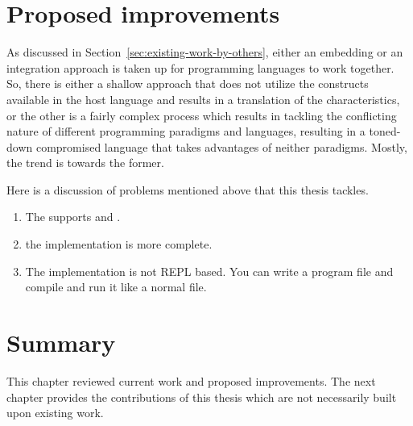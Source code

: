 \documentclass[thesis-solanki.tex]{subfiles}
\begin{document}
\section{Proposed improvements}\label{sec:things-fixed}

As discussed in Section~\ref{sec:existing-work-by-others},
either an embedding or an integration approach is taken up for programming languages to work together.
So, there is either a shallow approach that does not utilize the constructs available in the host language and
results in a translation of the characteristics, or the other is a fairly complex process which results in tackling
the conflicting nature of different programming paradigms and languages, resulting in a toned-down compromised
language that takes advantages of neither paradigms.
Mostly, the trend is towards the former.


Here is a discussion of problems mentioned above that this thesis tackles.
\begin{enumerate}
\item The  supports  and .

\item the implementation is more complete.

\item The implementation is not REPL based. You can write a program file and compile and run it like a normal  file.
\end{enumerate}

\section{Summary}
This chapter reviewed current work and proposed improvements. The next chapter
provides the contributions of this thesis which are not necessarily built upon existing work.

\ifMain
\begin{scope}
  \nolinenumbers
  \enotesize
  \par
  \begin{singlespace}
  \setlength{\parskip}{12pt plus 2pt minus 1pt}
  \theendnotes
  \par
  \end{singlespace}
\end{scope}
\fi
\end{document}
